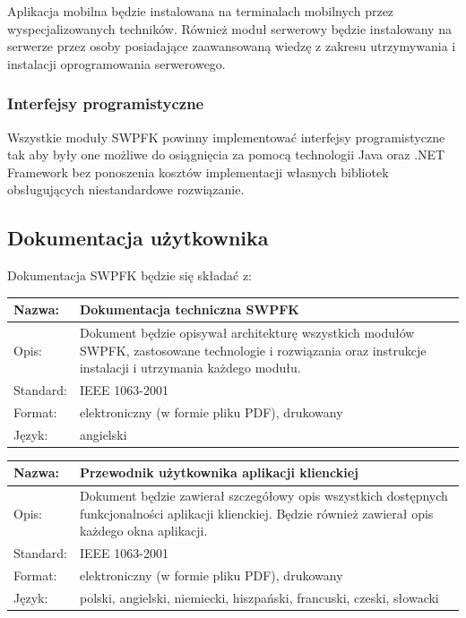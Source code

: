 Aplikacja mobilna będzie instalowana na terminalach mobilnych przez wyspecjalizowanych techników. Również moduł serwerowy będzie instalowany na serwerze przez osoby posiadające zaawansowaną wiedzę z zakresu utrzymywania i instalacji oprogramowania serwerowego.

\subsubsection{Interfejsy programistyczne}
Wszystkie moduły SWPFK powinny implementować interfejsy programistyczne tak aby były one możliwe do osiągnięcia za pomocą technologii Java oraz .NET Framework bez ponoszenia kosztów implementacji własnych bibliotek obsługujących niestandardowe rozwiązanie.

\subsection{Dokumentacja użytkownika}
Dokumentacja SWPFK będzie się składać z:
\begin{center}
\begin{tabular}[h]{|p{2cm}|p{13.1cm}|}
\hline
Nazwa: & Dokumentacja techniczna SWPFK \\ \hline
Opis: & Dokument będzie opisywał architekturę wszystkich modułów SWPFK, zastosowane technologie i rozwiązania oraz instrukcje instalacji i utrzymania każdego modułu. \\ \hline
Standard: & IEEE 1063-2001 \\ \hline
Format: & elektroniczny (w formie pliku PDF), drukowany \\ \hline
Język: & angielski \\
\hline
\end{tabular}
\end{center}

\begin{center}
\begin{tabular}[h]{|p{2cm}|p{13.1cm}|}
\hline
Nazwa: & Przewodnik użytkownika aplikacji klienckiej \\ \hline
Opis: & Dokument będzie zawierał szczegółowy opis wszystkich dostępnych  funkcjonalności aplikacji klienckiej. Będzie również zawierał opis każdego okna aplikacji. \\ \hline
Standard: & IEEE 1063-2001 \\ \hline
Format: & elektroniczny (w formie pliku PDF), drukowany \\ \hline
Język: & polski, angielski, niemiecki, hiszpański, francuski, czeski, słowacki \\
\hline
\end{tabular}
\end{center}

